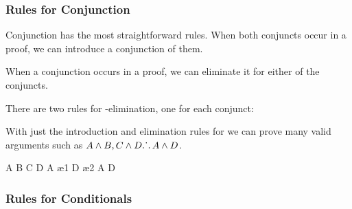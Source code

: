 \subsubsection{Rules for Conjunction}

Conjunction has the most straightforward rules. When both conjuncts occur in a
proof, we can introduce a conjunction of them.

\begin{fitchrule}
  \label{def:and-introduction-rule}
  \leavevmode
  \vspace{-0.9\baselineskip}
  \begin{fitchproof}
     {\ephi}
     {\epsi}
     {\ephi\eand\epsi} 
  \end{fitchproof}
\end{fitchrule}

When a conjunction occurs in a proof, we can eliminate it for either of the
conjuncts.

\begin{fitchrule}
  \label{def:and-introduction-rule}
  \leavevmode
  There are two rules for \eand-elimination, one for each conjunct: \\
\end{fitchrule}

With just the introduction and elimination rules for \sand we can prove many
valid arguments such as $A \wedge B, C \wedge D \ldotp\dot{}\,\ldotp A \wedge D$.

\begin{fitchproof}
   {A \eand B} 
   {C \eand D} 
   {A}         \ae{1}
   {D}         \ae{2}
   {A \eand D} 
\end{fitchproof}

\subsubsection{Rules for Conditionals}

